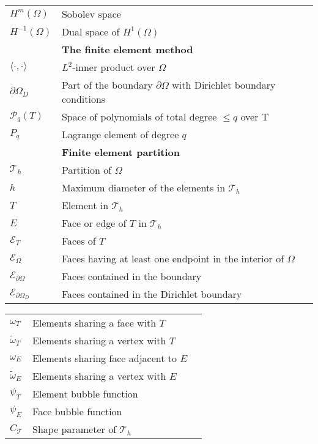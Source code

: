 \begin{tabular}{lll}
    $H^m(\Omega)$ & Sobolev space  \\
    $H^{-1}(\Omega)$  & Dual space of $H^1(\Omega)$ &\\[3pt]
    & \textbf{The finite element method} & \\[3pt]
    $\langle \cdot, \cdot \rangle$  & $L^2$-inner product over $\Omega$ &\\[3pt]
    $\partial \Omega_D$  & Part of the boundary $\partial \Omega $
                                         with Dirichlet boundary conditions  &\\[3pt]
    $\mathcal{P}_q(T)$ &  Space of polynomials of total
                       degree $\leq q$ over T &\\[3pt]
    $P_q$   & Lagrange element of degree $q$ &\\[3pt]
    		& \textbf{Finite element partition} & \\[3pt]
    $\mathcal{T}_h$   & Partition of $\Omega$ &\\[3pt]
    $h$   & Maximum diameter of the elements in $\mathcal{T}_h$ &\\[3pt]
    $T$   & Element in $\mathcal{T}_h$ &\\[3pt]
    $E$   & Face or edge of $T$ in $\mathcal{T}_h$ &\\[3pt]
    $\mathcal{E}_T$   & Faces of $T$ &\\[3pt]
    $\mathcal{E}_\Omega$   & Faces having at least one endpoint in the interior of $\Omega$ &\\[3pt]
    $\mathcal{E}_{\partial\Omega}$   & Faces contained in the boundary &\\[3pt]
    $\mathcal{E}_{\partial\Omega_D}$   & Faces contained in the Dirichlet boundary &\\[3pt]
 \end{tabular}
\newpage
\begin{tabular}{lll}
    $\omega_T$   & Elements sharing a face with $T$ &\\[3pt]
    $\tilde{\omega}_T$  & Elements sharing a vertex with $T$ &\\[3pt]
    $\omega_E$   & Elements sharing face adjacent to $E$ &\\[3pt]
    $\tilde{\omega}_E$  & Elements sharing a vertex with $E$ &\\[3pt]
	$\psi_T$  & Element bubble function &\\[3pt]
	$\psi_E$  & Face bubble function &\\[3pt]
    $C_{\mathcal{T}}$   & Shape parameter of $\mathcal{T}_h$ &\\[3pt]
 \end{tabular}

